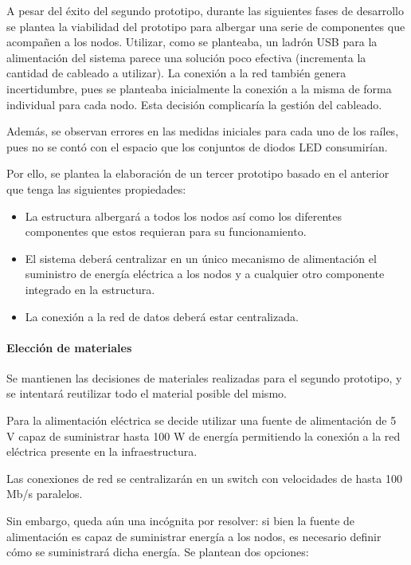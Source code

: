 A pesar del éxito del segundo prototipo, durante las siguientes fases de desarrollo se plantea la viabilidad del prototipo para albergar una serie de componentes que acompañen a los nodos. Utilizar, como se planteaba, un ladrón USB %
para la alimentación del sistema parece una solución poco efectiva (incrementa la cantidad de cableado a utilizar). La conexión a la red también genera incertidumbre, pues se planteaba inicialmente la conexión a la misma de forma individual para cada nodo. Esta decisión complicaría la gestión del cableado.

Además, se observan errores en las medidas iniciales para cada uno de los raíles, pues no se contó con el espacio que los conjuntos de diodos LED consumirían.

Por ello, se plantea la elaboración de un tercer prototipo basado en el anterior que tenga las siguientes propiedades:

\begin{itemize}

\item La estructura albergará a todos los nodos así como los diferentes componentes que estos requieran para su funcionamiento.

\item El sistema deberá centralizar en un único mecanismo de alimentación el suministro de energía eléctrica a los nodos y a cualquier otro componente integrado en la estructura.

\item La conexión a la red de datos deberá estar centralizada.

\end{itemize}

\paragraph{Elección de materiales}

Se mantienen las decisiones de materiales realizadas para el segundo prototipo, y se intentará reutilizar todo el material posible del mismo.

Para la alimentación eléctrica se decide utilizar una fuente de alimentación de 5 V capaz de suministrar hasta 100 W de energía permitiendo la conexión a la red eléctrica presente en la infraestructura.

Las conexiones de red se centralizarán en un switch con velocidades de hasta 100 Mb/s paralelos.

Sin embargo, queda aún una incógnita por resolver: si bien la fuente de alimentación es capaz de suministrar energía a los nodos, es necesario definir cómo se suministrará dicha energía. Se plantean dos opciones:

